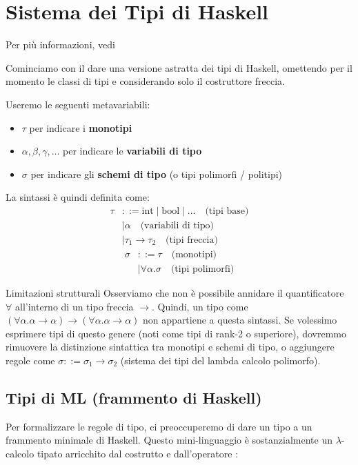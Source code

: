 \chapter{Sistema dei Tipi di Haskell}
Per più informazioni, vedi

Cominciamo con il dare una versione astratta dei tipi di Haskell, omettendo per il momento le classi di tipi e considerando solo il costruttore freccia. 

Useremo le seguenti metavariabili:
\begin{itemize}
    \item $\tau$ per indicare i \textbf{monotipi} 
    \item $\alpha, \beta, \gamma, \dots$ per indicare le \textbf{variabili di tipo} 
    \item $\sigma$ per indicare gli \textbf{schemi di tipo} (o tipi polimorfi / politipi) 
\end{itemize}

La sintassi è quindi definita come:
\begin{align*}
    \tau &::= \text{int} \mid \text{bool} \mid \dots \quad \text{(tipi base)} \\ 
         &\mid \alpha \quad \text{(variabili di tipo)} \\ 
         &\mid \tau_1 \rightarrow \tau_2 \quad \text{(tipi freccia)} 
\end{align*}
\begin{align*}
    \sigma &::= \tau \quad \text{(monotipi)} \\ 
           &\mid \forall \alpha . \sigma \quad \text{(tipi polimorfi)} 
\end{align*}

\begin{gframe}{Limitazioni strutturali}
    Osserviamo che non è possibile annidare il quantificatore $\forall$ all'interno di un tipo freccia $\rightarrow$. 
    Quindi, un tipo come $(\forall\alpha.\alpha\rightarrow\alpha)\rightarrow(\forall\alpha.\alpha\rightarrow\alpha)$ non appartiene a questa sintassi. 
    Se volessimo esprimere tipi di questo genere (noti come tipi di rank-2 o superiore), dovremmo rimuovere la distinzione sintattica tra monotipi e schemi di tipo, o aggiungere regole come $\sigma ::= \sigma_1 \rightarrow \sigma_2$ (sistema dei tipi del lambda calcolo polimorfo).
\end{gframe}

\section{Tipi di ML (frammento di Haskell)}
Per formalizzare le regole di tipo, ci preoccuperemo di dare un tipo a un frammento minimale di Haskell. 
Questo mini-linguaggio è sostanzialmente un $\lambda$-calcolo tipato arricchito dal costrutto  e dall'operatore : 

